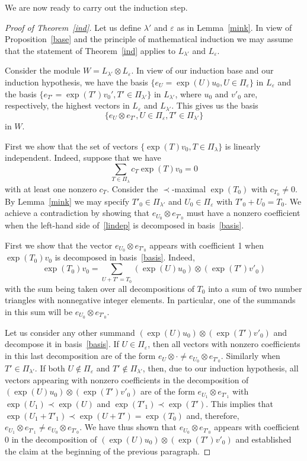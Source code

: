 \documentclass[ALCO,ThmDefs,Unicode]{cedram}
\newcommand{\la}{\lambda}
\begin{document}
We are now ready to carry out the induction step.
\begin{proof}[Proof of Theorem~\ref{ind}]
Let us define $\la'$ and $\varepsilon$ as in Lemma~\ref{mink}. In view of Proposition~\ref{base} and the principle of mathematical induction we may assume that the statement of Theorem~\ref{ind} applies to $L_{\la'}$ and $L_\varepsilon$.

Consider the module $W=L_{\la'}\otimes L_\varepsilon$. In view of our induction base and our induction hypothesis, we have the basis $\{e_U=\exp(U)u_0,U\in\Pi_{\varepsilon}\}$ in $L_{\varepsilon}$ and the basis $\{e_{T'}=\exp(T')v_0',T'\in\Pi_{\la'}\}$ in $L_{\la'}$, where $u_0$ and $v'_0$ are, respectively, the highest vectors in $L_\varepsilon$ and $L_{\la'}$. This gives us the basis
\begin{equation}\label{basis}
\{e_U\otimes e_{T'},U\in\Pi_{\varepsilon},T'\in\Pi_{\la'}\}
\end{equation}
in $W$.

First we show that the set of vectors $\{\exp(T)v_0,T\in\Pi_\la\}$ is linearly independent. Indeed, suppose that we have
\begin{equation}\label{lindep}
\sum_{T\in\Pi_\la}c_T\exp(T)v_0=0
\end{equation}
with at least one nonzero $c_T$. Consider the $\prec$-maximal $\exp(T_0)$ with $c_{T_0}\neq 0$. By Lemma~\ref{mink} we may specify $T'_0\in\Pi_{\la'}$ and $U_0\in\Pi_\varepsilon$ with $T'_0+U_0=T_0$. We achieve a contradiction by showing that $e_{U_0}\otimes e_{T'_0}$ must have a nonzero coefficient when the left-hand side of~\eqref{lindep} is decomposed in basis~\eqref{basis}.

First we show that the vector $e_{U_0}\otimes e_{T'_0}$ appears with coefficient 1 when $\exp(T_0)v_0$ is decomposed in basis~\eqref{basis}. Indeed,
\[
\exp(T_0)v_0=\sum_{U+T'=T_0}(\exp(U)u_0)\otimes(\exp(T')v'_0)
\]
with the sum being taken over all decompositions of $T_0$ into a sum of two number triangles with nonnegative integer elements. In particular, one of the summands in this sum will be $e_{U_0}\otimes e_{T'_0}$.

Let us consider any other summand $(\exp(U)u_0)\otimes(\exp(T')v'_0)$ and decompose it in basis~\eqref{basis}. If $U\in\Pi_\varepsilon$, then all vectors with nonzero coefficients in this last decomposition are of the form $e_U\otimes\cdot\neq e_{U_0}\otimes e_{T'_0}$. Similarly when $T'\in\Pi_{\la'}$. If both $U\notin\Pi_\varepsilon$ and $T'\notin\Pi_{\la'}$, then, due to our induction hypothesis, all vectors appearing with nonzero coefficients in the decomposition of $(\exp(U)u_0)\otimes(\exp(T')v'_0)$ are of the form $e_{U_1}\otimes e_{T'_1}$ with $\exp(U_1)\prec\exp(U)$ and $\exp(T'_1)\prec\exp(T')$. This implies that $\exp(U_1+T'_1)\prec\exp(U+T')=\exp(T_0)$ and, therefore, $e_{U_1}\otimes e_{T'_1}\neq e_{U_0}\otimes e_{T'_0}$. We have thus shown that $e_{U_0}\otimes e_{T'_0}$ appears with coefficient 0 in the decomposition of $(\exp(U)u_0)\otimes(\exp(T')v'_0)$ and established the claim at the beginning of the previous paragraph.


\end{proof}
\end{document}
